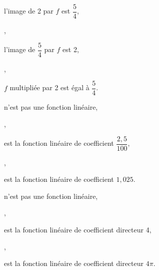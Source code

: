 \ifdefined\COMPLETE
\else
    
    
\fi



\ifdefined\CORRECTION
    \begin{alterqcm}[lq=10cm,correction]
\else
    \begin{alterqcm}[lq=10cm]
\fi


 

  {%
   {\begin{minipage}[t]{6cm} l'image de 2 par $f$ est $\dfrac{5}{4}$, \end{minipage}},
   {\begin{minipage}[t]{6cm} l'image de $\dfrac{5}{4}$ par $f$ est 2,\end{minipage}},
   {\begin{minipage}[t]{6cm} $f$ multipliée par 2 est égal à $\dfrac{5}{4}$.
    \end{minipage}}
 }

  {%
   {\begin{minipage}[t]{7cm} n'est pas une fonction linéaire, \end{minipage}},
   {\begin{minipage}[t]{7cm} est la fonction linéaire de coefficient $\dfrac{2,5}{100}$,\end{minipage}},
   {\begin{minipage}[t]{7cm} est la fonction linéaire de coefficient $1,025$.
    \end{minipage}}
 }

  {%
   {\begin{minipage}[t]{7cm} n'est pas une fonction linéaire, \end{minipage}},
   {\begin{minipage}[t]{7cm} est la fonction linéaire de coefficient directeur 4,\end{minipage}},
   {\begin{minipage}[t]{7cm} est la fonction linéaire de coefficient directeur $4\pi$.
    \end{minipage}}
 }


\end{alterqcm}
\end{alterqcm}
